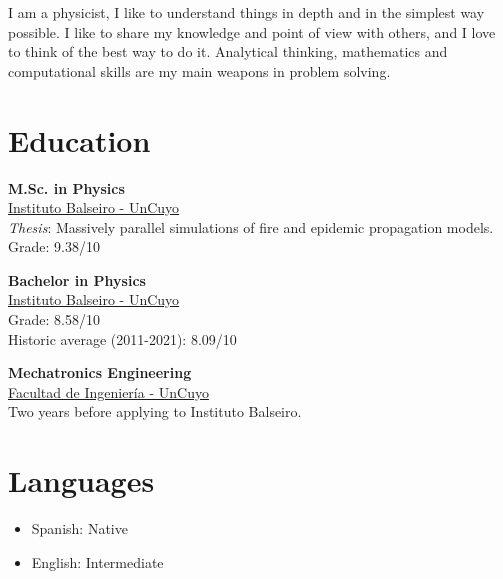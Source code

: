 \documentclass[a4paper,10pt]{article}
\begin{document}
\begin{adjustbox}{valign=t}
\begin{minipage}{0.44\textwidth}
I am a physicist, I like to understand things in depth and in the simplest way possible.
I like to share my knowledge and point of view with others, 
and I love to think of the best way to do it. Analytical thinking, mathematics 
and computational skills are my main weapons in problem solving.

\vspace*{-.5cm}
\section*{Education}
	\begin{description}
	\raggedright
	
    \item [\normalfont \textcolor{ColorOne}{Aug. 2021 - Dec. 2022.}] \textbf{M.Sc. in Physics}\\
	\href{https://www.ib.edu.ar/}{\textcolor{ColorTwo}{Instituto Balseiro - UnCuyo}}\\
    \textit{Thesis}: Massively parallel simulations of fire and epidemic propagation models. \\
    Grade: 9.38/10
	

	\item [\normalfont \textcolor{ColorOne}{Aug. 2019 - Dec. 2021.}] \textbf{Bachelor in Physics}\\
	\href{https://www.ib.edu.ar/}{\textcolor{ColorTwo}{Instituto Balseiro - UnCuyo}}\\
    Grade: 8.58/10\\
    Historic average (2011-2021): 8.09/10

	\item [\normalfont \textcolor{ColorOne}{Mar. 2017 - Dec. 2018.}] \textbf{Mechatronics Engineering}\\ 
	\href{https://ingenieria.uncuyo.edu.ar/}{\textcolor{ColorTwo}{Facultad de Ingeniería - UnCuyo}}\\
    Two years before applying to Instituto Balseiro.
 
\end{description}

\vspace*{-.5cm}
\section*{Languages}
\begin{itemize}
	\raggedright
	\item Spanish: Native
	\item English: Intermediate
\end{itemize}


\vfill
\end{minipage}
\end{adjustbox}
\end{document}
